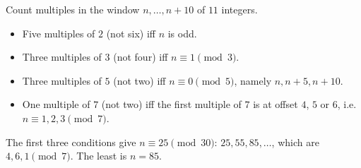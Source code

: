 Count multiples in the window $n,\dots,n+10$ of $11$ integers.
\begin{itemize}
\item Five multiples of $2$ (not six) iff $n$ is odd.
\item Three multiples of $3$ (not four) iff $n\equiv1\pmod3$.
\item Three multiples of $5$ (not two) iff $n\equiv0\pmod5$, namely $n,n+5,n+10$.
\item One multiple of $7$ (not two) iff the first multiple of $7$ is at offset $4$, $5$ or $6$, i.e. $n\equiv1,2,3\pmod7$.
\end{itemize}
The first three conditions give $n\equiv25\pmod{30}$: $25,55,85,\dots$, which are $4,6,1\pmod7$. The least is $n=\boxed{85}$.
